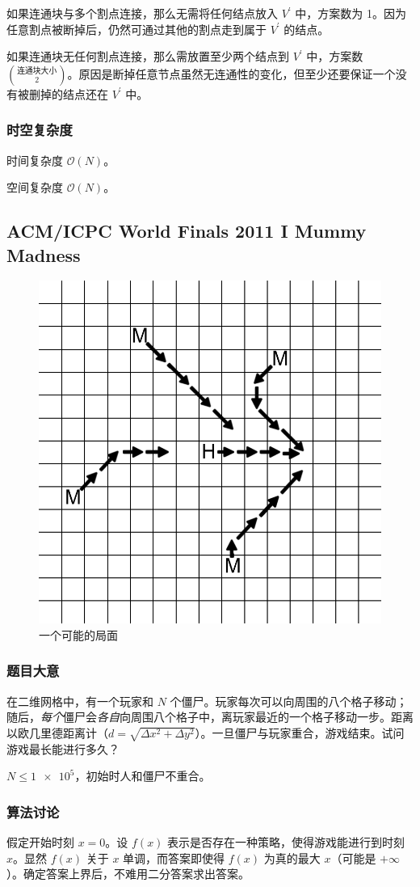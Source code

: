 				如果连通块与多个割点连接，那么无需将任何结点放入  $V^\prime$  中，方案数为 1。因为任意割点被断掉后，仍然可通过其他的割点走到属于 $V^\prime$ 的结点。
					
				如果连通块无任何割点连接，那么需放置至少两个结点到 $V^\prime$  中，方案数 $\binom{\text{连通块大小}}{2}$。原因是断掉任意节点虽然无连通性的变化，但至少还要保证一个没有被删掉的结点还在 $V^\prime$ 中。
				
				
			\subsubsection{时空复杂度}
				时间复杂度 $\mathcal{O}\left(N\right)$。
					
				空间复杂度 $\mathcal{O}\left(N\right)$。
		\newpage
		
		\subsection{ACM/ICPC World Finals 2011 I Mummy Madness}
				
				\begin{figure}
					\centering
					\includegraphics[width=0.3 \textwidth]{5.png}
					\caption{一个可能的局面}
				\end{figure}
			\subsubsection{题目大意}
				在二维网格中，有一个玩家和 $N$ 个僵尸。玩家每次可以向周围的八个格子移动；随后，\emph{每个}僵尸会\emph{各自}向周围八个格子中，离玩家最近的一个格子移动一步。距离以欧几里德距离计（$d = \sqrt{\Delta x^2 + \Delta y^2}$）。一旦僵尸与玩家重合，游戏结束。试问游戏最长能进行多久？
				
				$N \le \num{1e5}$，初始时人和僵尸不重合。
			\subsubsection{算法讨论}
				假定开始时刻 $x = 0$。设 $f(x)$ 表示是否存在一种策略，使得游戏能进行到时刻 $x$。显然 $f(x)$ 关于 $x$ 单调，而答案即使得 $f(x)$ 为真的最大 $x$（可能是 $+ \infty$）。确定答案上界后，不难用二分答案求出答案。
				
